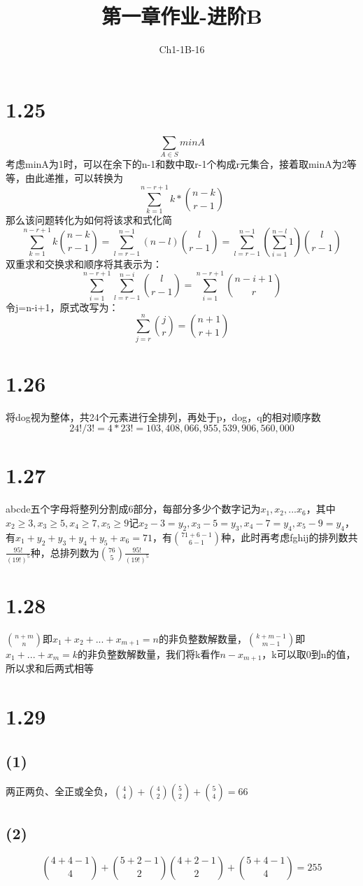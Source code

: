 \documentclass{article}
\title{第一章作业-进阶B}
\author{Ch1-1B-16}
\begin{document}
\maketitle

\section*{1.25}
\[\sum_{A\in S} minA\]考虑minA为1时，可以在余下的n-1和数中取r-1个构成r元集合，接着取minA为2等等，由此递推，可以转换为\[\sum_{k=1}^{n-r+1} k*\binom{n-k}{r-1}\]那么该问题转化为如何将该求和式化简
\[\sum_{k=1}^{n-r+1} k\binom{n-k}{r-1}=\sum_{l=r-1}^{n-1} (n-l)\binom{l}{r-1}=\sum_{l=r-1}^{n-1}(\sum_{i=1}^{n-l}1)\binom{l}{r-1}\]
双重求和交换求和顺序将其表示为：
\[\sum_{i=1}^{n-r+1}\sum_{l=r-1}^{n-i}\binom{l}{r-1}=\sum_{i=1}^{n-r+1}\binom{n-i+1}{r}\]
令j=n-i+1，原式改写为：
\[\sum_{j=r}^n \binom{j}{r} = \binom{n+1}{r+1}
\]
\section*{1.26}
将dog视为整体，共24个元素进行全排列，再处于p，dog，q的相对顺序数
\[24!/3!=4*23!=103,408,066,955,539,906,560,000\]
\section*{1.27}
abcde五个字母将整列分割成6部分，每部分多少个数字记为$x_1,x_2,...x_6$，其中$x_2\geq3,x_3\geq5,x_4\geq7,x_5\geq9$记$x_2-3=y_2,x_3-5=y_3,x_4-7=y_4,x_5-9=y_4$，有$x_1+y_2+y_3+y_4+y_5+x_6=71$，有$\binom{71+6-1}{6-1}$种，此时再考虑fghij的排列数共$\frac{95!}{(19!)^5}$种，总排列数为$\binom{76}{5}\frac{95!}{(19!)^5}$
\section*{1.28}
$\binom{n+m}{n}$即$x_1+x_2+...+x_{m+1}=n$的非负整数解数量，$\binom{k+m-1}{m-1}$即$x_1+...+x_m=k$的非负整数解数量，我们将k看作$n-x_{m+1}$，k可以取0到n的值，所以求和后两式相等
\section*{1.29}
\subsection*{(1)}
两正两负、全正或全负，$\binom{4}{4}+\binom{4}{2}\binom{5}{2}+\binom{5}{4}=66$
\subsection*{(2)}
\[\binom{4+4-1}{4}+\binom{5+2-1}{2}\binom{4+2-1}{2}+\binom{5+4-1}{4}=255\]
\end{document}
